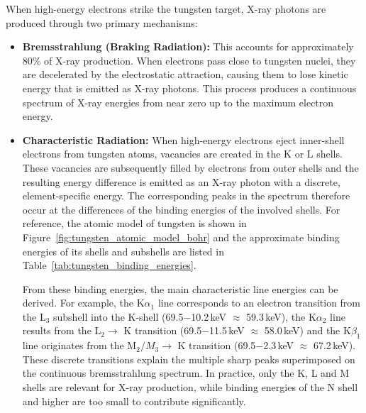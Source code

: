 When high-energy electrons strike the tungsten target, X-ray photons are
produced through two primary mechanisms:

\begin{itemize}
    \item \textbf{Bremsstrahlung (Braking Radiation):} This accounts for
    approximately 80\% of X-ray production. When electrons pass close to
    tungsten nuclei, they are decelerated by the electrostatic attraction,
    causing them to lose kinetic energy that is emitted as X-ray photons. This
    process produces a continuous spectrum of X-ray energies from near zero up
    to the maximum electron energy.

    \item \textbf{Characteristic Radiation:} When high-energy electrons eject
    inner-shell electrons from tungsten atoms, vacancies are created in the K or
    L shells. These vacancies are subsequently filled by electrons from outer
    shells and the resulting energy difference is emitted as an X-ray photon
    with a discrete, element-specific energy. The corresponding peaks in the
    spectrum therefore occur at the differences of the binding energies of the
    involved shells. For reference, the atomic model of tungsten is shown in
    Figure~\ref{fig:tungsten_atomic_model_bohr} and the approximate binding energies
    of its shells and subshells are listed in
    Table~\ref{tab:tungsten_binding_energies}.

    From these binding energies, the main characteristic line energies can be
    derived. For example, the K$\alpha_1$ line corresponds to an electron
    transition from the L$_3$ subshell into the K-shell (69.5$-$10.2\,keV
    $\approx$ 59.3\,keV), the K$\alpha_2$ line results from the L$_2
    \rightarrow$ K transition (69.5$-$11.5\,keV $\approx$ 58.0\,keV) and the
    K$\beta_1$ line originates from the M$_2/M_3 \rightarrow$ K transition
    (69.5$-$2.3\,keV $\approx$ 67.2\,keV). These discrete transitions explain
    the multiple sharp peaks superimposed on the continuous bremsstrahlung
    spectrum. In practice, only the K, L and M shells are relevant for X-ray
    production, while binding energies of the N shell and higher are too small
    to contribute significantly.
    
\end{itemize}


